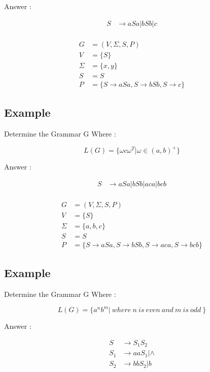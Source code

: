 \documentclass[12pt]{book}
\begin{document}
Answer :

\begin{align*}
 S &\to aSa | bSb | c \\
\end{align*}


\begin{align*}
G &= (V, \Sigma, S, P) \\
V &= \{ S \} \\
\Sigma &= \{ x, y \} \\
S &= S \\
P &= \{ S \to aSa ,
S \to bSb ,
S \to c  \}
\end{align*}


\subsection{Example}


Determine the Grammar G Where :

$$
L(G) = \{ \omega c \omega^{T} | \omega \in (a,b)^{+} \}
$$

Answer :

\begin{align*}
 S &\to aSa | bSb | aca | bcb \\
\end{align*}


\begin{align*}
G &= (V, \Sigma, S, P) \\
V &= \{ S \} \\
\Sigma &= \{ a, b, c \} \\
S &= S \\
P &= \{ S \to aSa ,
S \to bSb ,
S \to aca , 
S \to bcb \}
\end{align*}



\subsection{Example}

Determine the Grammar G Where :

$$
L(G) = \{ a^{n} b^{m} | \:where\: n\: is\: even\: and\: m\: is\: odd\: \}
$$

Answer :

\begin{align*}
 S &\to S_{1}S_{2} \\
 S_{1} &\to aaS_{1} | \wedge \\
 S_{2} &\to bbS_{2} | b \\
\end{align*}
\end{document}
